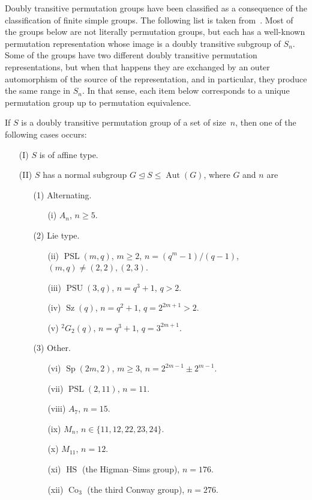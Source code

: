 Doubly transitive permutation groups have been classified as a consequence of the classification of finite simple groups.
The following list is taken from~\cite{Kantor:85}.
Most of the groups below are not literally permutation groups, but each has a well-known permutation representation whose image is a doubly transitive subgroup of $S_n$.
Some of the groups have two different doubly transitive permutation representations, but when that happens they are exchanged by an outer automorphism of the source of the representation, and in particular, they produce the same range in $S_n$.
In that sense, each item below corresponds to a unique permutation group up to permutation equivalence.

\begin{proposition}
\label{prop.classification}
If $S$ is a doubly transitive permutation group of a set of size~$n$, then one of the following cases occurs:
\begin{itemize}
\item[(I)]
$S$ is of affine type.
\item[(II)]
$S$ has a normal subgroup $G \unlhd S\leq\operatorname{Aut}(G)$, where $G$ and $n$ are
\begin{itemize}
\item[(1)]
Alternating.
\begin{itemize}
\item[(i)]
$A_n$, $n\geq5$.
\end{itemize}
\item[(2)]
Lie type.
\begin{itemize}
\item[(ii)]
$\operatorname{PSL}(m,q)$, $m\geq2$, $n=(q^m-1)/(q-1)$, $(m,q)\neq(2,2),(2,3)$.
\item[(iii)]
$\operatorname{PSU}(3,q)$, $n=q^3+1$, $q>2$.
\item[(iv)]
$\operatorname{Sz}(q)$, $n=q^2+1$, $q=2^{2m+1}>2$.
\item[(v)]
$^2G_2(q)$, $n=q^3+1$, $q=3^{2m+1}$.
\end{itemize}
\item[(3)]
Other.
\begin{itemize}
\item[(vi)]
$\operatorname{Sp}(2m,2)$, $m\geq3$, $n=2^{2m-1}\pm2^{m-1}$.
\item[(vii)]
$\operatorname{PSL}(2,11)$, $n=11$.
\item[(viii)]
$A_7$, $n=15$.
\item[(ix)]
$M_n$, $n\in\{11,12,22,23,24\}$.
\item[(x)]
$M_{11}$, $n=12$.
\item[(xi)]
$\operatorname{HS}$ (the Higman--Sims group), $n=176$.
\item[(xii)]
$\operatorname{Co}_3$ (the third Conway group), $n=276$.
\end{itemize}
\end{itemize}
\end{itemize}
\end{proposition}

